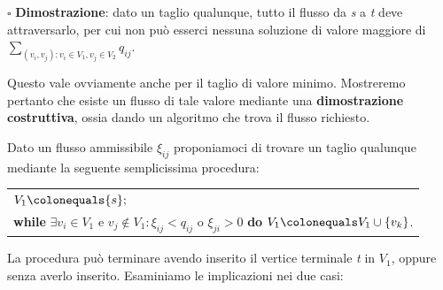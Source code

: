 \documentclass[11pt]{book}
\begin{document}
\vspace{11pt} $\square$ {\bf Dimostrazione}: dato un taglio qualunque,
tutto il flusso da {\em s} a {\em t} deve attraversarlo, per cui non
pu\`o esserci nessuna soluzione di valore maggiore di
$\sum\limits_{(v_i,v_j) : v_i \in V_1, v_j \in V_2} q_{ij}$.

Questo vale ovviamente anche per il taglio di valore
minimo. Mostreremo pertanto che esiste un flusso di tale valore
mediante una {\bf dimostrazione costruttiva}, ossia dando un algoritmo
che trova il flusso richiesto.

Dato un flusso ammissibile $\xi_{ij}$ proponiamoci di trovare un
taglio qualunque mediante la seguente semplicissima procedura:

\vspace{11pt}
\begin{center}
  \begin{tabular}{||l||}
    \hline\hline
    $V_1 \colonequals \{ s \};$\\
    {\bf while} $\exists v_i \in V_1$ e $v_j \not\in V_1 : \xi_{ij} <
    q_{ij}$ o $\xi_{ji} > 0$ {\bf do} $V_1 \colonequals V_1 \cup \{ v_k\}$.\\
    \hline\hline
  \end{tabular}
\end{center}
\vspace{11pt}

La procedura pu\`o terminare avendo inserito il vertice terminale {\em
  t} in $V_1$, oppure senza averlo inserito. Esaminiamo le
implicazioni nei due casi:
\end{document}

